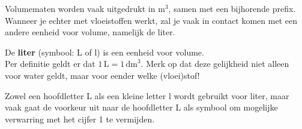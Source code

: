 \documentclass{ximera}
\begin{document}
Volumematen worden vaak uitgedrukt in $\mathrm{m}^{3}$, samen met een bijhorende prefix. Wanneer je echter met vloeistoffen werkt, zal je vaak in contact komen met een andere eenheid voor volume, namelijk de liter.

\begin{definition}\nl
    De \textbf{liter} (symbool: L of l) is een eenheid voor volume. \\
    Per definitie geldt er dat $1 \, \mathrm{L} = 1 \, \mathrm{dm}^{3}$. Merk op dat deze gelijkheid niet alleen voor water geldt, maar voor eender welke (vloei)stof!

    \begin{remark}
        Zowel een hoofdletter L als een kleine letter l wordt gebruikt voor liter, maar vaak gaat de voorkeur uit naar de hoofdletter L als symbool om mogelijke verwarring met het cijfer 1 te vermijden.
    \end{remark}
\end{definition}
\end{document}
